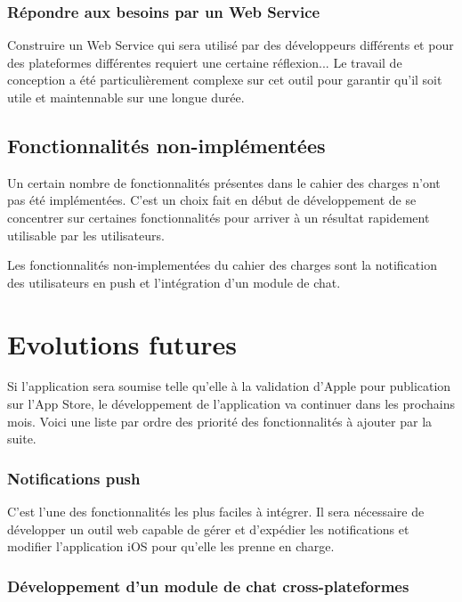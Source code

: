 \documentclass[11pt, french]{report}
\begin{document}
\subsubsection{Répondre aux besoins par un Web Service}

Construire un Web Service qui sera utilisé par des développeurs différents et pour des plateformes différentes requiert une certaine réflexion... Le travail de conception a été particulièrement complexe sur cet outil pour garantir qu'il soit utile et maintennable sur une longue durée.

\subsection{Fonctionnalités non-implémentées}

Un certain nombre de fonctionnalités présentes dans le cahier des charges n'ont pas été implémentées. C'est un choix fait en début de développement de se concentrer sur certaines fonctionnalités pour arriver à un résultat rapidement utilisable par les utilisateurs.

Les fonctionnalités non-implementées du cahier des charges sont la notification des utilisateurs en push et l'intégration d'un module de chat.

\section{Evolutions futures}

Si l'application sera soumise telle qu'elle à la validation d'Apple pour publication sur l'App Store, le développement de l'application va continuer dans les prochains mois. Voici une liste par ordre des priorité des fonctionnalités à ajouter par la suite.

\subsubsection{Notifications push}

C'est l'une des fonctionnalités les plus faciles à intégrer. Il sera nécessaire de développer un outil web capable de gérer et d'expédier les notifications et modifier l'application iOS pour qu'elle les prenne en charge.

\subsubsection{Développement d'un module de chat cross-plateformes}
\end{document}
